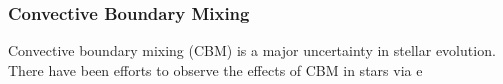 {\color{purple}
\subsubsection{Convective Boundary Mixing}
}

Convective boundary mixing (CBM) is a major uncertainty in stellar evolution. There have been efforts to observe the effects of CBM in stars via e

